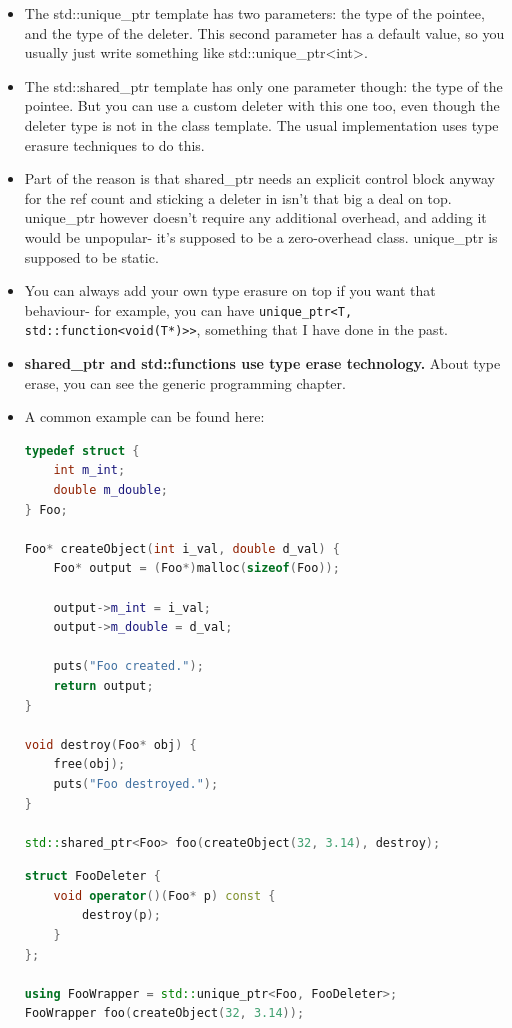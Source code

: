 \documentclass[a4paper,12pt,twoside]{book}
\begin{document}
\begin{itemize}
	\item The std::unique\_ptr template has two parameters: the type of the pointee, and the type of the deleter. This second parameter has a default value, so you usually just write something like std::unique\_ptr<int>.
	
	\item The std::shared\_ptr template has only one parameter though: the type of the pointee. But you can use a custom deleter with this one too, even though the deleter type is not in the class template. The usual implementation uses type erasure techniques to do this.
	
	\item Part of the reason is that shared\_ptr needs an explicit control block anyway for the ref count and sticking a deleter in isn't that big a deal on top. unique\_ptr however doesn't require any additional overhead, and adding it would be unpopular- it's supposed to be a zero-overhead class. unique\_ptr is supposed to be static.
	
	\item You can always add your own type erasure on top if you want that behaviour- for example, you can have \texttt{unique\_ptr<T, std::function<void(T*)>>}, something that I have done in the past.
	
	\item \textbf{shared\_ptr and std::functions use type erase technology.} About type erase, you can see the generic programming chapter.
	
	\item A common example can be found here:
\begin{lstlisting}[frame=single, language=c++]
typedef struct {
	int m_int;
	double m_double;
} Foo;
	
Foo* createObject(int i_val, double d_val) {
	Foo* output = (Foo*)malloc(sizeof(Foo));
	
	output->m_int = i_val;
	output->m_double = d_val;
	
	puts("Foo created.");
	return output;
}
	
void destroy(Foo* obj) {
	free(obj);
	puts("Foo destroyed.");        
}
	
std::shared_ptr<Foo> foo(createObject(32, 3.14), destroy);
\end{lstlisting}
	
\begin{lstlisting}[frame=single, language=c++]
struct FooDeleter {
	void operator()(Foo* p) const {
		destroy(p);
	}
};
	
using FooWrapper = std::unique_ptr<Foo, FooDeleter>;
FooWrapper foo(createObject(32, 3.14));
\end{lstlisting}
\end{itemize}
\end{document}
